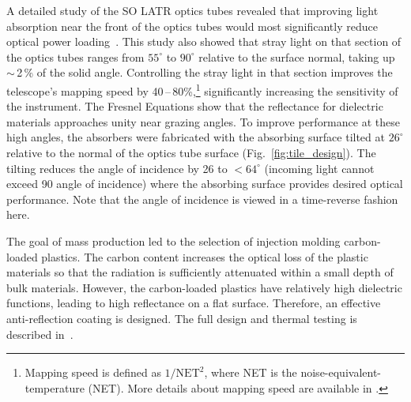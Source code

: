 A detailed study of the SO LATR optics tubes revealed that improving light absorption near the front of the optics tubes would most significantly reduce optical power loading~\cite{gudmundsson/etal:2020}. This study also showed that stray light on that section of the optics tubes ranges from $55^\circ$ to $90^\circ$ relative to the surface normal, taking up $\sim$\,2\,\% of the solid angle. Controlling the stray light in that section improves the telescope's mapping speed by 40\,--\,80\%,\footnote{Mapping speed is defined as $1/\textrm{NET}^2$, where NET is the noise-equivalent-temperature (NET). More details about mapping speed are available in \cite{hill/etal:2018}.} significantly increasing the sensitivity of the instrument. The Fresnel Equations show that the reflectance for dielectric materials approaches unity near grazing angles.  To improve performance at these high angles, the absorbers were fabricated with the absorbing surface tilted at $26^\circ$ relative to the normal of the optics tube surface (Fig.~\ref{fig:tile_design}). The tilting reduces the angle of incidence by 26\dg{} to $<64^\circ$ (incoming light cannot exceed 90\dg{} angle of incidence) where the absorbing surface provides desired optical performance. Note that the angle of incidence is viewed in a time-reverse fashion here.

The goal of mass production led to the selection of injection molding carbon-loaded plastics. The carbon content increases the optical loss of the plastic materials so that the radiation is sufficiently attenuated within a small depth of bulk materials. However, the carbon-loaded plastics have relatively high dielectric functions, leading to high reflectance on a flat surface. Therefore, an effective anti-reflection coating is designed.  The full design and thermal testing is described in~\cite{Xu_2021}.

